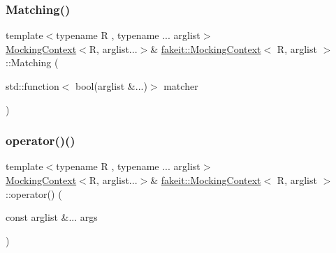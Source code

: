 \mbox{\label{classfakeit_1_1MockingContext_a631dd9877017e082b2e1191b02f4c17a}} 
\subsubsection{\texorpdfstring{Matching()}{Matching()}\hspace{0.1cm}{\footnotesize\ttfamily [9/9]}}
{\footnotesize\ttfamily template$<$typename R , typename ... arglist$>$ \\
\mbox{\hyperlink{classfakeit_1_1MockingContext}{Mocking\+Context}}$<$R, arglist...$>$\& \mbox{\hyperlink{classfakeit_1_1MockingContext}{fakeit\+::\+Mocking\+Context}}$<$ R, arglist $>$\+::Matching (\begin{DoxyParamCaption}\item[{std\+::function$<$ bool(arglist \&...)$>$}]{matcher }\end{DoxyParamCaption})\hspace{0.3cm}{\ttfamily [inline]}}

\mbox{\label{classfakeit_1_1MockingContext_a70a55886680449fa36e8f5869af93389}} 
\subsubsection{\texorpdfstring{operator()()}{operator()()}\hspace{0.1cm}{\footnotesize\ttfamily [1/18]}}
{\footnotesize\ttfamily template$<$typename R , typename ... arglist$>$ \\
\mbox{\hyperlink{classfakeit_1_1MockingContext}{Mocking\+Context}}$<$R, arglist...$>$\& \mbox{\hyperlink{classfakeit_1_1MockingContext}{fakeit\+::\+Mocking\+Context}}$<$ R, arglist $>$\+::operator() (\begin{DoxyParamCaption}\item[{const arglist \&...}]{args }\end{DoxyParamCaption})\hspace{0.3cm}{\ttfamily [inline]}}

